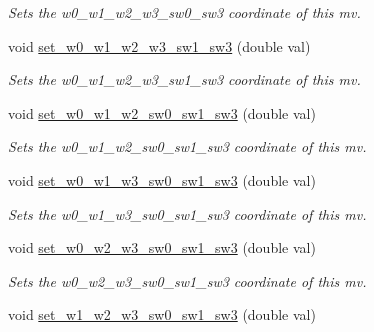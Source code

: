 \begin{DoxyCompactItemize}
\begin{DoxyCompactList}\small\item\em Sets the w0\-\_\-w1\-\_\-w2\-\_\-w3\-\_\-sw0\-\_\-sw3 coordinate of this mv. \end{DoxyCompactList}\item 
\hypertarget{classe3ga_1_1mv_a2121f53917403a1cbaea2b8d5c0119c8}{void \hyperlink{classe3ga_1_1mv_a2121f53917403a1cbaea2b8d5c0119c8}{set\-\_\-w0\-\_\-w1\-\_\-w2\-\_\-w3\-\_\-sw1\-\_\-sw3} (double val)}\label{classe3ga_1_1mv_a2121f53917403a1cbaea2b8d5c0119c8}

\begin{DoxyCompactList}\small\item\em Sets the w0\-\_\-w1\-\_\-w2\-\_\-w3\-\_\-sw1\-\_\-sw3 coordinate of this mv. \end{DoxyCompactList}\item 
\hypertarget{classe3ga_1_1mv_acdf6e5fa63cb51bf286975b5c01d3ee6}{void \hyperlink{classe3ga_1_1mv_acdf6e5fa63cb51bf286975b5c01d3ee6}{set\-\_\-w0\-\_\-w1\-\_\-w2\-\_\-sw0\-\_\-sw1\-\_\-sw3} (double val)}\label{classe3ga_1_1mv_acdf6e5fa63cb51bf286975b5c01d3ee6}

\begin{DoxyCompactList}\small\item\em Sets the w0\-\_\-w1\-\_\-w2\-\_\-sw0\-\_\-sw1\-\_\-sw3 coordinate of this mv. \end{DoxyCompactList}\item 
\hypertarget{classe3ga_1_1mv_a8f8db194bf36a42583e0c8030bd390f6}{void \hyperlink{classe3ga_1_1mv_a8f8db194bf36a42583e0c8030bd390f6}{set\-\_\-w0\-\_\-w1\-\_\-w3\-\_\-sw0\-\_\-sw1\-\_\-sw3} (double val)}\label{classe3ga_1_1mv_a8f8db194bf36a42583e0c8030bd390f6}

\begin{DoxyCompactList}\small\item\em Sets the w0\-\_\-w1\-\_\-w3\-\_\-sw0\-\_\-sw1\-\_\-sw3 coordinate of this mv. \end{DoxyCompactList}\item 
\hypertarget{classe3ga_1_1mv_a2e926104c56de4cb48198e8523417475}{void \hyperlink{classe3ga_1_1mv_a2e926104c56de4cb48198e8523417475}{set\-\_\-w0\-\_\-w2\-\_\-w3\-\_\-sw0\-\_\-sw1\-\_\-sw3} (double val)}\label{classe3ga_1_1mv_a2e926104c56de4cb48198e8523417475}

\begin{DoxyCompactList}\small\item\em Sets the w0\-\_\-w2\-\_\-w3\-\_\-sw0\-\_\-sw1\-\_\-sw3 coordinate of this mv. \end{DoxyCompactList}\item 
\hypertarget{classe3ga_1_1mv_ab128e20eb1616b1bcb40f76fbb69e491}{void \hyperlink{classe3ga_1_1mv_ab128e20eb1616b1bcb40f76fbb69e491}{set\-\_\-w1\-\_\-w2\-\_\-w3\-\_\-sw0\-\_\-sw1\-\_\-sw3} (double val)}\label{classe3ga_1_1mv_ab128e20eb1616b1bcb40f76fbb69e491}


\end{DoxyCompactItemize}
